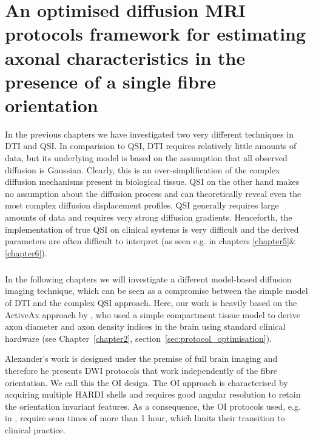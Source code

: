 \chapter{An optimised diffusion MRI protocols framework for estimating axonal characteristics in the presence of a single fibre orientation}
\label{chapter7}
\glsresetall %
In the previous chapters we have investigated two very different techniques in \gls{DTI} and \gls{QSI}. In comparision to \gls{QSI}, \gls{DTI} requires relatively little amounts of data, but its underlying model is based on the assumption that all observed diffusion is Gaussian. Clearly, this is an over-simplification of the complex diffusion mechanisms present in biological tissue. \gls{QSI} on the other hand makes no assumption about the diffusion process and can theoretically reveal even the most complex diffusion displacement profiles. \gls{QSI} generally requires large amounts of data and requires very strong diffusion gradients. Henceforth, the implementation of true \gls{QSI} on clinical systems is very difficult and the derived parameters are often difficult to interpret (as seen e.g. in chapters \ref{chapter5}\&\ref{chapter6}).
\paragraph{}
In the following chapters we will investigate a different model-based diffusion imaging technique, which can be seen as a compromise between the simple model of \gls{DTI} and the complex \gls{QSI} approach. Here, our work is heavily based on the ActiveAx approach by \citet{Alexander:2008}, who used a simple compartment tissue model to derive axon diameter and axon density indices in the brain using standard clinical hardware (see Chapter~\ref{chapter2}, section~\ref{sec:protocol_optimisation}).


Alexander's work is designed under the premise of full brain imaging and therefore he presents DWI protocols that work independently of the fibre orientation. We call this the \gls{OI} design. The \gls{OI} approach is characterised by acquiring multiple \gls{HARDI} shells and requires good angular resolution to retain the orientation invariant features. As a consequence, the {\gls{OI}} protocols used, e.g. in \citep{Alexander:2010}, require scan times of more than 1 hour, which limits their transition to clinical practice.



